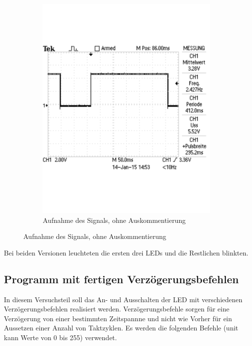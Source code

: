 \documentclass[12pt,a4paper]{article}
\begin{document}
\begin{figure}[H]
\begin{subfigure}[b]{0.45\textwidth}
   \includegraphics[trim = 0mm 50mm 0mm 50mm, clip, scale = 0.4]{TEK0004.pdf}
  \caption[Aufnahme des Signals, ohne Auskommentierung]{Aufnahme des Signals, ohne Auskommentierung} 
  \label{fig:g_4}
\end{subfigure}
\end{figure}

Bei beiden Versionen leuchteten die ersten drei LEDs und die Restlichen blinkten.

\subsection{Programm mit fertigen Verzögerungsbefehlen}

In diesem Versuchsteil soll das An- und Ausschalten der LED mit verschiedenen Verzögerungsbefehlen realisiert werden. Verzögerungsbefehle sorgen für eine Verzögerung von einer bestimmten Zeitspannne und nicht wie Vorher für ein Aussetzen einer Anzahl von Taktzyklen. Es werden die folgenden Befehle (unit kann Werte von 0 bis 255) verwendet.
\end{document}
